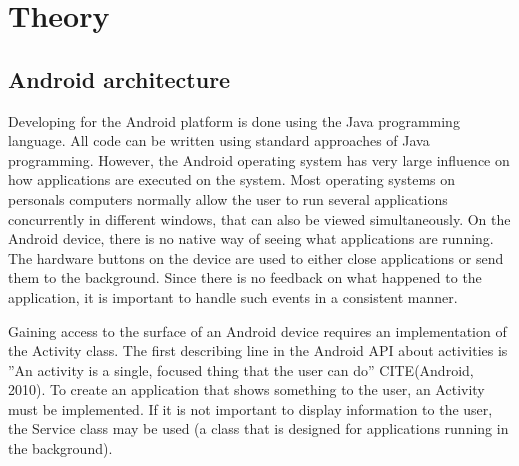 \chapter{Theory}

\section{Android architecture}

Developing for the Android platform is done using the Java programming language. All code can be written using standard approaches of Java programming. However, the Android operating system has very large influence on how applications are executed on the system. Most operating systems on personals computers normally allow the user to run several applications concurrently in different windows, that can also be viewed simultaneously. On the Android device, there is no native way of seeing what applications are running. The hardware buttons on the device are used to either close applications or send them to the background. Since there is no feedback on what happened to the application, it is important to handle such events in a consistent manner.
 
Gaining access to the surface of an Android device requires an implementation of the Activity class. The first describing line in the Android API about activities is ''An activity is a single, focused thing that the user can do'' CITE(Android, 2010). To create an application that shows something to the user, an Activity must be implemented. If it is not important to display information to the user, the Service class may be used (a class that is designed for applications running in the background).

